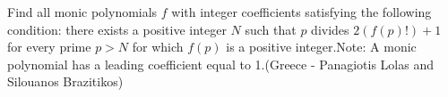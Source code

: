 Find all monic polynomials $f$ with integer coefficients satisfying the following condition: there exists a positive integer $N$ such that $p$ divides $2(f(p)!)+1$ for every prime $p>N$ for which $f(p)$ is a positive integer.Note: A monic polynomial has a leading coefficient equal to 1.(Greece - Panagiotis Lolas and Silouanos Brazitikos)